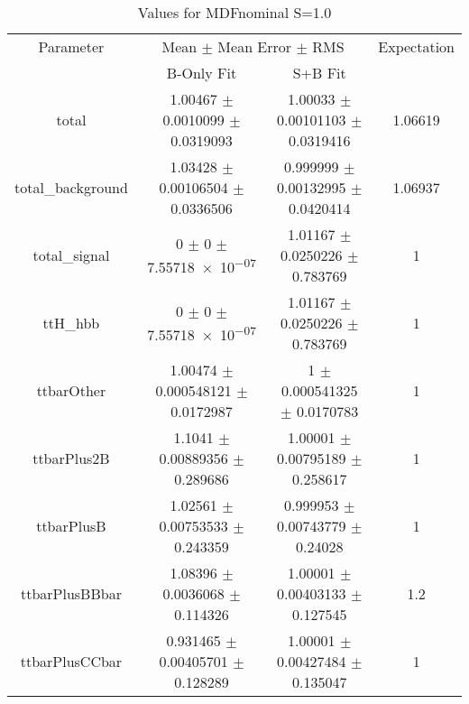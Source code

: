 \begin{table}
\centering
\caption{Values for MDFnominal S=1.0}
\begin{tabular}{cccc}
\toprule
Parameter & \multicolumn{2}{c}{Mean $\pm$ Mean Error $\pm$ RMS} & Expectation\\
 & B-Only Fit & S+B Fit & \\
\midrule
total & \num{1.00467} $\pm$ \num{0.0010099} $\pm$ \num{0.0319093} & \num{1.00033} $\pm$ \num{0.00101103} $\pm$ \num{0.0319416} & \num{1.06619}\\
total\_background & \num{1.03428} $\pm$ \num{0.00106504} $\pm$ \num{0.0336506} & \num{0.999999} $\pm$ \num{0.00132995} $\pm$ \num{0.0420414} & \num{1.06937}\\
total\_signal & \num{0} $\pm$ \num{0} $\pm$ \num{7.55718e-07} & \num{1.01167} $\pm$ \num{0.0250226} $\pm$ \num{0.783769} & \num{1}\\
ttH\_hbb & \num{0} $\pm$ \num{0} $\pm$ \num{7.55718e-07} & \num{1.01167} $\pm$ \num{0.0250226} $\pm$ \num{0.783769} & \num{1}\\
ttbarOther & \num{1.00474} $\pm$ \num{0.000548121} $\pm$ \num{0.0172987} & \num{1} $\pm$ \num{0.000541325} $\pm$ \num{0.0170783} & \num{1}\\
ttbarPlus2B & \num{1.1041} $\pm$ \num{0.00889356} $\pm$ \num{0.289686} & \num{1.00001} $\pm$ \num{0.00795189} $\pm$ \num{0.258617} & \num{1}\\
ttbarPlusB & \num{1.02561} $\pm$ \num{0.00753533} $\pm$ \num{0.243359} & \num{0.999953} $\pm$ \num{0.00743779} $\pm$ \num{0.24028} & \num{1}\\
ttbarPlusBBbar & \num{1.08396} $\pm$ \num{0.0036068} $\pm$ \num{0.114326} & \num{1.00001} $\pm$ \num{0.00403133} $\pm$ \num{0.127545} & \num{1.2}\\
ttbarPlusCCbar & \num{0.931465} $\pm$ \num{0.00405701} $\pm$ \num{0.128289} & \num{1.00001} $\pm$ \num{0.00427484} $\pm$ \num{0.135047} & \num{1}\\
\bottomrule
\end{tabular}
\end{table}